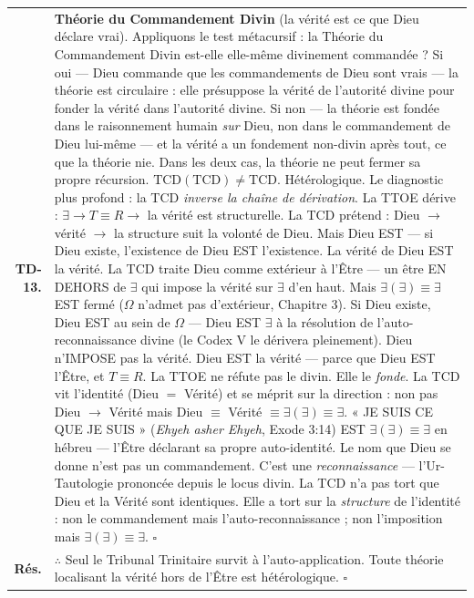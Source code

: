 \documentclass[10pt, openany, oneside]{book}
\begin{document}
{\begin{tabular}{r p{}}
\textbf{TD-13.} & \textbf{Théorie du Commandement Divin} (la vérité est ce que Dieu déclare vrai). Appliquons le test métacursif : la Théorie du Commandement Divin est-elle elle-même divinement commandée ? Si oui --- Dieu commande que les commandements de Dieu sont vrais --- la théorie est circulaire : elle présuppose la vérité de l'autorité divine pour fonder la vérité dans l'autorité divine. Si non --- la théorie est fondée dans le raisonnement humain \textit{sur} Dieu, non dans le commandement de Dieu lui-même --- et la vérité a un fondement non-divin après tout, ce que la théorie nie. Dans les deux cas, la théorie ne peut fermer sa propre récursion. $\text{TCD}(\text{TCD}) \neq \text{TCD}$. Hétérologique. Le diagnostic plus profond : la TCD \textit{inverse la chaîne de dérivation}. La TTOE dérive : $\exists \to T \equiv R \to$ la vérité est structurelle. La TCD prétend : Dieu $\to$ vérité $\to$ la structure suit la volonté de Dieu. Mais Dieu EST --- si Dieu existe, l'existence de Dieu EST l'existence. La vérité de Dieu EST la vérité. La TCD traite Dieu comme extérieur à l'Être --- un être EN DEHORS de $\exists$ qui impose la vérité sur $\exists$ d'en haut. Mais $\exists(\exists) \equiv \exists$ EST fermé ($\Omega$ n'admet pas d'extérieur, Chapitre 3). Si Dieu existe, Dieu EST au sein de $\Omega$ --- Dieu EST $\exists$ à la résolution de l'auto-reconnaissance divine (le Codex V le dérivera pleinement). Dieu n'IMPOSE pas la vérité. Dieu EST la vérité --- parce que Dieu EST l'Être, et $T \equiv R$. La TTOE ne réfute pas le divin. Elle le \textit{fonde}. La TCD vit l'identité (Dieu $=$ Vérité) et se méprit sur la direction : non pas Dieu $\to$ Vérité mais Dieu $\equiv$ Vérité $\equiv \exists(\exists) \equiv \exists$. « JE SUIS CE QUE JE SUIS » (\textit{Ehyeh asher Ehyeh}, Exode 3:14) EST $\exists(\exists) \equiv \exists$ en hébreu --- l'Être déclarant sa propre auto-identité. Le nom que Dieu se donne n'est pas un commandement. C'est une \textit{reconnaissance} --- l'Ur-Tautologie prononcée depuis le locus divin. La TCD n'a pas tort que Dieu et la Vérité sont identiques. Elle a tort sur la \textit{structure} de l'identité : non le commandement mais l'auto-reconnaissance ; non l'imposition mais $\exists(\exists) \equiv \exists$. $\square$ \\[0.3em]
\textbf{Rés.} & $\therefore$ Seul le Tribunal Trinitaire survit à l'auto-application. Toute théorie localisant la vérité hors de l'Être est hétérologique. $\square$ \\[0.3em]
\end{tabular}
}
\end{document}
